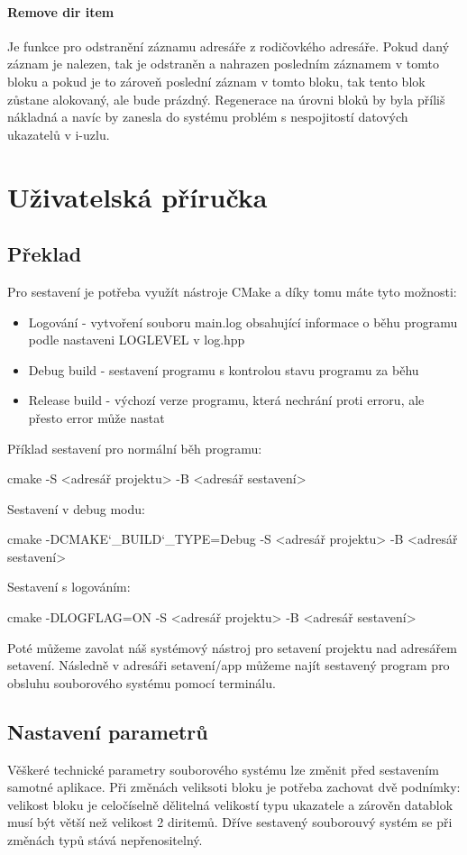 \documentclass[12pt, a4paper]{report}
\begin{document}
\subsubsection{Remove dir item}
Je funkce pro odstranění záznamu adresáře z rodičovkého adresáře. Pokud daný záznam je nalezen, tak je odstraněn a nahrazen posledním záznamem v tomto bloku a pokud je to zároveň poslední záznam v tomto bloku, tak tento blok zůstane alokovaný, ale bude prázdný. Regenerace na úrovni bloků by byla příliš nákladná a navíc by zanesla do systému problém s nespojitostí datových ukazatelů v i-uzlu.




\chapter{Uživatelská příručka}
\section{Překlad}
Pro sestavení je potřeba využít nástroje CMake a díky tomu máte tyto možnosti:
\begin{itemize}
 \item Logování - vytvoření souboru main.log obsahující informace o běhu programu podle nastaveni \ttfamily LOGLEVEL \normalfont v \ttfamily log.hpp \normalfont
 \item Debug build - sestavení programu s kontrolou stavu programu za běhu
 \item Release build - výchozí verze programu, která nechrání proti erroru, ale přesto error může nastat
\end{itemize}
Příklad sestavení pro normální běh programu:

\ttfamily cmake -S <adresář projektu> -B <adresář sestavení>

\normalfont
\noindent Sestavení v debug modu:

\ttfamily cmake -DCMAKE\char`_BUILD\char`_TYPE=Debug -S <adresář projektu> -B <adresář sestavení>

\normalfont
\noindent Sestavení s logováním:

\ttfamily cmake -DLOGFLAG=ON -S <adresář projektu> -B <adresář sestavení>

\normalfont
\noindent
Poté můžeme zavolat náš systémový nástroj pro setavení projektu nad adresářem setavení.
Následně v \ttfamily adresáři setavení/app \normalfont můžeme najít sestavený program pro obsluhu souborového systému pomocí terminálu.
\section{Nastavení parametrů}
Věškeré technické parametry souborového systému lze změnit před sestavením samotné aplikace. Při změnách veliksoti bloku je potřeba zachovat dvě podnímky: velikost bloku je celočíselně dělitelná velikostí typu ukazatele a zárověn datablok musí být větší než velikost 2 diritemů. Dříve sestavený souborouvý systém se při změnách typů stává nepřenositelný.
\end{document}
